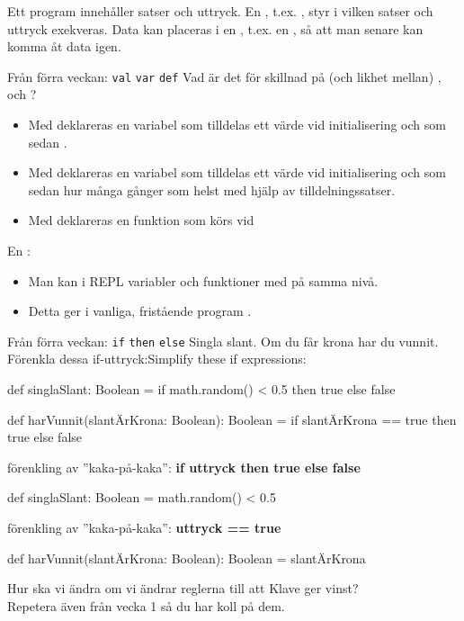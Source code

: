 

\ifkompendium

\noindent Ett program innehåller satser och uttryck. En , t.ex. , styr i vilken  satser och uttryck exekveras. Data kan placeras i en , t.ex. en , så att man senare kan komma åt data igen.    
\fi


\ifkompendium\else
\begin{SlideExtra}{Från förra veckan: \texttt{val} \texttt{var} \texttt{def}}
  Vad är det för skillnad på (och likhet mellan) ,  och ? \pause
  \begin{itemize}
    \item Med  deklareras en variabel som tilldelas ett värde vid initialisering och som sedan .
    \item Med  deklareras en variabel som tilldelas ett värde vid initialisering och som sedan  hur många gånger som helst med hjälp av tilldelningssatser.
    \item Med  deklareras en funktion som körs vid 
  \end{itemize}
  \pause\vspace{1em} En : 
  \begin{itemize}
  \item Man kan i REPL  variabler och funktioner med   på samma nivå. 
  \item Detta ger i vanliga, fristående program . 
  \end{itemize}
\end{SlideExtra}

\begin{SlideExtra}{Från förra veckan: \texttt{if} \texttt{then} \texttt{else}}\SlideFontSmall
{} Singla slant. Om du får krona har du vunnit. \\[0.5em]
\ifswedish Förenkla dessa if-uttryck:\else Simplify these if expressions:\fi
\begin{Code}
def singlaSlant: Boolean = if math.random() < 0.5 then true else false

def harVunnit(slantÄrKrona: Boolean): Boolean = 
  if slantÄrKrona == true then true else false
\end{Code}
\pause förenkling av ''kaka-på-kaka'': \textbf{if uttryck then true else false}
\begin{Code}
def singlaSlant: Boolean = math.random() < 0.5
\end{Code}
\pause förenkling av ''kaka-på-kaka'':  \textbf{uttryck == true}
\begin{Code}
def harVunnit(slantÄrKrona: Boolean): Boolean = slantÄrKrona
\end{Code}
\pause Hur ska vi ändra  om vi ändrar reglerna till att Klave ger vinst? \\
\pause Repetera även  från vecka 1 så du har koll på dem.
\end{SlideExtra}

